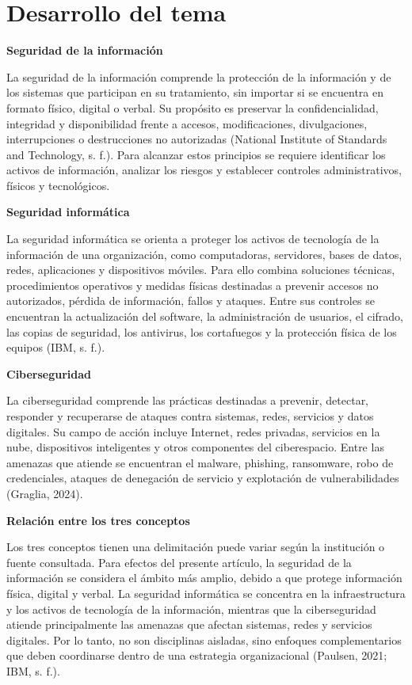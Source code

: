 \documentclass[12pt]{article}
\begin{document}
	\section*{Desarrollo del tema}
	
	\textbf{Seguridad de la información}
	
	La seguridad de la información comprende la protección de la información y de los sistemas que participan en su tratamiento, sin importar si se encuentra en formato físico, digital o verbal. Su propósito es preservar la confidencialidad, integridad y disponibilidad frente a accesos, modificaciones, divulgaciones, interrupciones o destrucciones no autorizadas (National Institute of Standards and Technology, s. f.). Para alcanzar estos principios se requiere identificar los activos de información, analizar los riesgos y establecer controles administrativos, físicos y tecnológicos.
	
	\textbf{Seguridad informática}
	
	La seguridad informática se orienta a proteger los activos de tecnología de la información de una organización, como computadoras, servidores, bases de datos, redes, aplicaciones y dispositivos móviles. Para ello combina soluciones técnicas, procedimientos operativos y medidas físicas destinadas a prevenir accesos no autorizados, pérdida de información, fallos y ataques. Entre sus controles se encuentran la actualización del software, la administración de usuarios, el cifrado, las copias de seguridad, los antivirus, los cortafuegos y la protección física de los equipos (IBM, s. f.).
	
	\textbf{Ciberseguridad}
	
	La ciberseguridad comprende las prácticas destinadas a prevenir, detectar, responder y recuperarse de ataques contra sistemas, redes, servicios y datos digitales. Su campo de acción incluye Internet, redes privadas, servicios en la nube, dispositivos inteligentes y otros componentes del ciberespacio. Entre las amenazas que atiende se encuentran el malware, phishing, ransomware, robo de credenciales, ataques de denegación de servicio y explotación de vulnerabilidades (Graglia, 2024).
	
	\textbf{Relación entre los tres conceptos}
	
	Los tres conceptos tienen una delimitación puede variar según la institución o fuente consultada. Para efectos del presente artículo, la seguridad de la información se considera el ámbito más amplio, debido a que protege información física, digital y verbal. La seguridad informática se concentra en la infraestructura y los activos de tecnología de la información, mientras que la ciberseguridad atiende principalmente las amenazas que afectan sistemas, redes y servicios digitales. Por lo tanto, no son disciplinas aisladas, sino enfoques complementarios que deben coordinarse dentro de una estrategia organizacional (Paulsen, 2021; IBM, s. f.).
	
\end{document}
